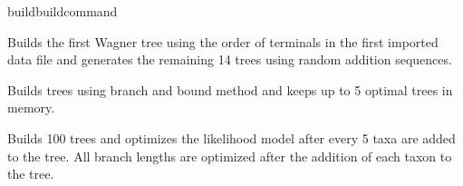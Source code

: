 \begin{command}{build}{buildcommand}
\begin{poyexamples}
            {Builds the first Wagner tree using the order of terminals in the first
            imported data file and generates the remaining
            14 trees using random addition sequences.}
            
            {Builds trees using branch and bound method and keeps up to
            5 optimal trees in memory.}
            
            {Builds 100 trees and optimizes the likelihood model after every 5 
            taxa are added to the tree.  All branch lengths are optimized after the addition 
            of each taxon to the tree.}
                    
	\end{poyexamples}

\end{command}


